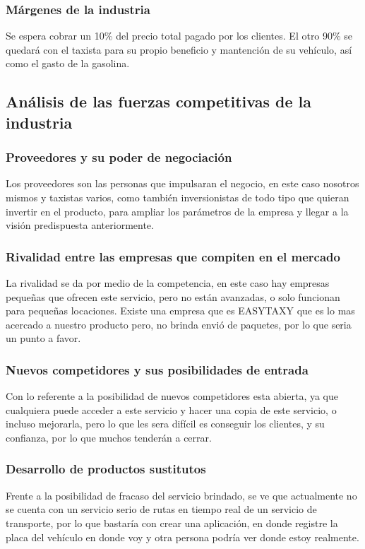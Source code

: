 \subsubsection{Márgenes de la industria}
Se espera cobrar un 10\% del precio total pagado por los clientes. El otro 90\% se quedará con el taxista para su propio beneficio y mantención de su vehículo, así como el gasto de la gasolina.


\subsection{Análisis de las fuerzas competitivas de la industria}

\subsubsection{Proveedores y su poder de negociación}
Los proveedores son las personas que impulsaran el negocio, en este caso nosotros mismos y taxistas varios, como también inversionistas de todo tipo que quieran invertir en el producto, para ampliar los parámetros de la empresa y llegar a la visión predispuesta anteriormente.
\subsubsection{Rivalidad entre las empresas que compiten en el mercado}
La rivalidad se da por medio de la competencia, en este caso hay empresas pequeñas que ofrecen este servicio, pero no están avanzadas, o solo funcionan para pequeñas locaciones. Existe una empresa que es EASYTAXY que es lo mas acercado a nuestro producto pero, no brinda envió de paquetes, por lo que seria un punto a favor.
\subsubsection{Nuevos competidores y sus posibilidades de entrada}
Con lo referente a la posibilidad de nuevos competidores esta abierta, ya que cualquiera puede acceder a este servicio y hacer una copia de este servicio, o incluso mejorarla, pero lo que les sera difícil es conseguir los clientes, y su confianza, por lo que muchos tenderán a cerrar.
\subsubsection{Desarrollo de productos sustitutos}
Frente a la posibilidad de fracaso del servicio brindado, se ve que  actualmente no se cuenta con un servicio serio de rutas en tiempo real de un servicio de transporte, por lo que bastaría con crear una aplicación, en donde  registre la placa del  vehículo en donde voy y otra persona podría ver donde estoy realmente.
